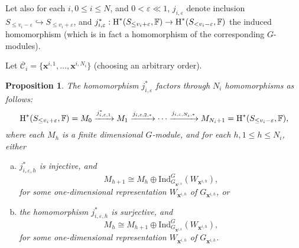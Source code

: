 \documentclass{amsart}
\newtheorem{proposition}{Proposition}
\theoremstyle{definition}
\theoremstyle{remark}
\numberwithin{equation}{section}
\begin{document}
Let also for each $i,0 \leq i \leq N$, and $0< {{\varepsilon}} \ll 1$, $j_{i,{{\varepsilon}}}$ denote inclusion $S_{\leq v_i -{{\varepsilon}}} \hookrightarrow S_{\leq v_i +{{\varepsilon}}}$, and $j_{i,{{\varepsilon}}}^\ast: {\mbox{\rm H}}^*(S_{\leq v_i +{{\varepsilon}}},{\mathbb{F}})  \rightarrow
{\mbox{\rm H}}^*(S_{< v_i -{{\varepsilon}}},{\mathbb{F}})$ the induced homomorphism (which is in fact a homomorphism
of the corresponding $G$-modules).

Let $\overline{\mathcal{C}}_i = \{{\mathbf{x}}^{i,1},\ldots,{\mathbf{x}}^{i,N_i} \}$ (choosing an arbitrary order).

\begin{proposition}
\label{prop:equivariant-morseb}
The homomorphism $j_{i,{{\varepsilon}}}^\ast$ factors through $N_i$ homomorphisms
as follows:
\[
{\mbox{\rm H}}^*(S_{\leq v_i +{{\varepsilon}}},{\mathbb{F}}) =M_0 \xrightarrow{j_{i,{{\varepsilon}},1}^\ast} M_1 \xrightarrow{j_{i,{{\varepsilon}},2,\ast}} \cdots
\xrightarrow{j_{i,{{\varepsilon}},N_i,\ast}} M_{N_i+1} ={\mbox{\rm H}}^*(S_{\leq v_i -{{\varepsilon}}},{\mathbb{F}}) ,
\]
where each $M_h$ is a finite dimensional $G$-module, and
for each $h, 1\leq h \leq N_i$,
 either
\begin{enumerate}[(a)]
\item
\label{item:theorem-main:a}
$j_{i,{{\varepsilon}},h}^\ast$ is injective, and 
\[
M_{h+1} \cong M_h\oplus {\mathrm{Ind}}_{G_{{{\mathbf{x}}^{i,h}}}}^{G}(W_{{\mathbf{x}}^{i,h}}),
\]
for some one-dimensional representation $W_{{\mathbf{x}}^{i,h}}$ of $G_{{\mathbf{x}}^{i,h}}$, or
\item
\label{item:theorem-main:b}
the homomorphism
$j_{i,{{\varepsilon}},h}^\ast$ is surjective, and 
\[
M_{h} \cong M_{h+1} \oplus {\mathrm{Ind}}_{G_{{\mathbf{x}}^{i,h}}}^{G}(W_{{\mathbf{x}}^{i,h}}),
\]
for some one-dimensional representation $W_{{\mathbf{x}}^{i,h}}$ of $G_{{\mathbf{x}}^{i,h}}$.
\end{enumerate}
\end{proposition}
 
\end{document}
